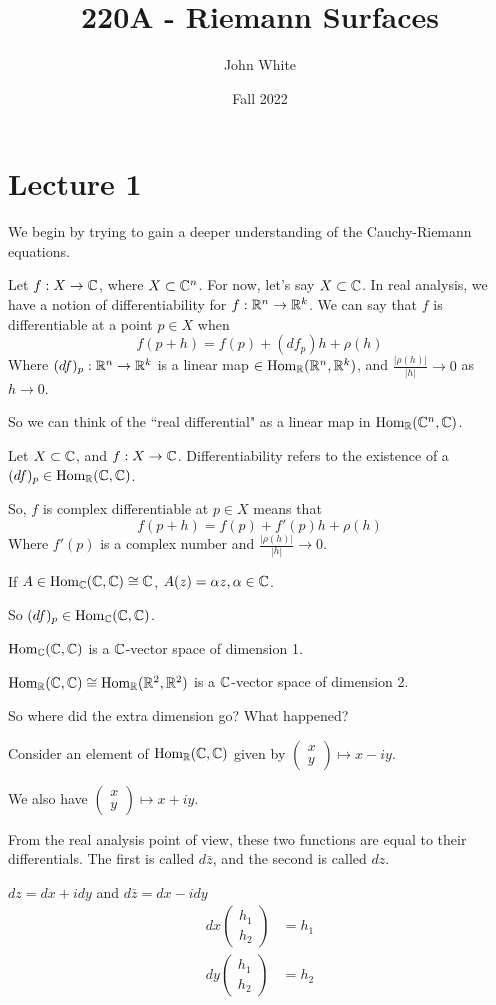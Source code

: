 \documentclass[x11names,reqno,14pt]{extarticle}
\title{220A - Riemann Surfaces}
\author{John White}
\date{Fall 2022}
\begin{document}
\section*{Lecture 1}

We begin by trying to gain a deeper understanding of the Cauchy-Riemann equations. 

Let $f:X\to \mathbb{C}$, where $X \subset \mathbb{C}^n$. For now, let's say $X \subset \mathbb{C}$. In real analysis, we have a notion of differentiability for $f:\mathbb{R}^n\to\mathbb{R}^k$. We can say that $f$ is differentiable at a point $p \in X$ when
\[
f(p + h) = f(p) + (df_p)h + \rho(h)
\]
Where $(df)_p:\mathbb{R}^n\to\mathbb{R}^k$ is a linear map $\in {\mathrm{Hom}}_{\mathbb{R}}(\mathbb{R}^n,\mathbb{R}^k)$, and $\frac{|\rho(h)|}{|h|} \to 0$ as $h \to 0$. 

So we can think of the ``real differential" as a linear map in ${\mathrm{Hom}}_{\mathbb{R}}(\mathbb{C}^n,\mathbb{C})$. 


Let $X \subset \mathbb{C}$, and $f:X\to\mathbb{C}$. Differentiability refers to the existence of a $(df)_p \in {\mathrm{Hom}}_{\mathbb{R}}(\mathbb{C},\mathbb{C})$. 

So, $f$ is complex differentiable at $p \in X$ means that 
\[
f(p + h) = f(p) + f'(p)h + \rho(h)
\]
Where $f'(p)$ is a complex number and $\frac{|\rho(h)|}{|h|}\to 0$. 

If $A \in {\mathrm{Hom}}_{\mathbb{C}}(\mathbb{C},\mathbb{C}) \cong \mathbb{C}$, $A(z) = \alpha z, \alpha \in \mathbb{C}$. 

So $(df)_p \in {\mathrm{Hom}}_{\mathbb{C}}(\mathbb{C},\mathbb{C})$.

${\mathrm{Hom}}_{\mathbb{C}}(\mathbb{C},\mathbb{C})$ is a $\mathbb{C}$-vector space of dimension 1. 

${\mathrm{Hom}}_{\mathbb{R}}(\mathbb{C}, \mathbb{C}) \cong {\mathrm{Hom}}_{\mathbb{R}}(\mathbb{R}^2,\mathbb{R}^2)$ is a $\mathbb{C}$-vector space of dimension 2. 

So where did the extra dimension go? What happened? 

Consider an element of ${\mathrm{Hom}}_{\mathbb{R}}(\mathbb{C},\mathbb{C})$ given by $\begin{pmatrix} x \\ y \end{pmatrix} \mapsto x - iy$. 

We also have $\begin{pmatrix} x \\ y \end{pmatrix} \mapsto x + iy$. 

From the real analysis point of view, these two functions are equal to their differentials. The first is called $d\bar{z}$, and the second is called $dz$.

$dz = dx + idy$ and
$d\bar{z} = dx - idy$
\begin{align*}
dx\begin{pmatrix} h_1 \\ h_2 \end{pmatrix} & = h_1 \\
dy\begin{pmatrix} h_1 \\ h_2 \end{pmatrix} & = h_2 \\
\end{align*}
\end{document}
